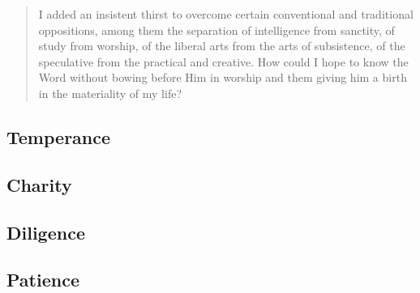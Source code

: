 \documentclass[letterpaper]{article}
\begin{document}
\begin{quote}
  I added an insistent thirst to overcome certain conventional and traditional oppositions, among them the separation of intelligence from sanctity, of study from worship, of the liberal arts from the arts of subsistence, of the speculative from the practical and creative. How could I hope to know the Word without bowing before Him in worship and them giving him a birth in the materiality of my life?
\end{quote}

\subsection{Temperance}
\hfill

\hfill

\hfill

\hfill

\hfill

\hfill

\hfill

\subsection{Charity}
\hfill

\hfill

\hfill

\hfill

\hfill

\hfill

\hfill

\subsection{Diligence}
\hfill

\hfill

\hfill

\hfill

\hfill

\hfill

\hfill

\subsection{Patience}
\hfill

\hfill

\hfill

\hfill

\hfill

\hfill
\end{document}
